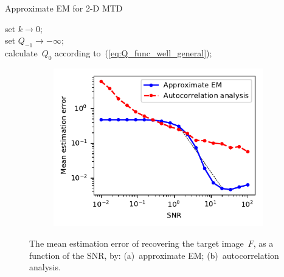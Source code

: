 \documentclass{article}
\begin{document}
\begin{algorithm}[!tb]
  \caption{Approximate EM for \mbox{2-D} MTD}\label{alg:approx_EM}
\BlankLine
set $k \rightarrow 0$;\\
set $Q_{-1} \rightarrow -\infty$;\\
calculate~$Q_{0}$ according to~(\ref{eq:Q_func_well_general});\\
\end{algorithm}
%
%

\begin{figure}[!tb]
	\begin{subfigure}[ht]{\columnwidth}
		\centering
		\includegraphics[width=0.85\columnwidth]{figures/experiment_SNR_err.pdf}
	\end{subfigure}
	\caption{The mean estimation error of recovering the target image~$F$, as a function of the SNR, by: (a)~approximate EM; (b)~autocorrelation analysis.}
\label{fig:noise_experiment}
\end{figure}
\end{document}

